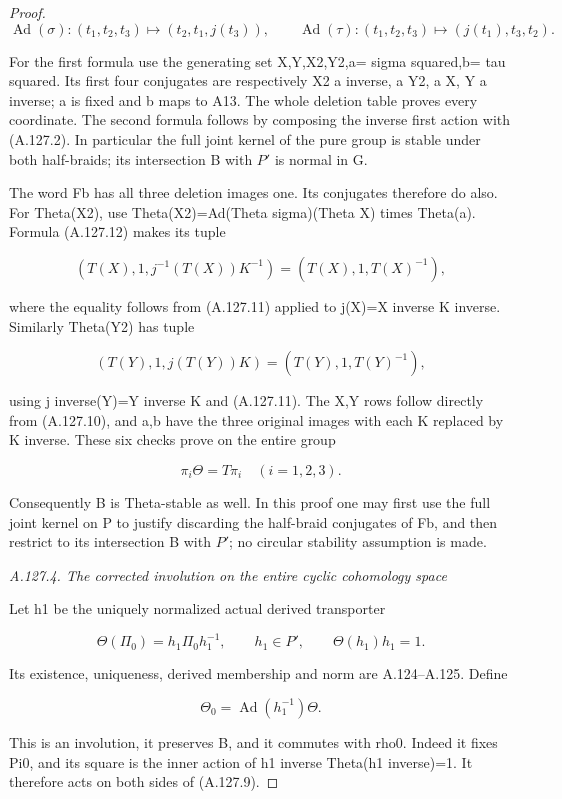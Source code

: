 \begin{proof}
\[
 \operatorname{Ad}(\sigma):(t_1,t_2,t_3)\mapsto(t_2,t_1,j(t_3)),
\qquad
 \operatorname{Ad}(\tau):(t_1,t_2,t_3)\mapsto(j(t_1),t_3,t_2).
\tag{A.127.12}
\]

For the first formula use the generating set X,Y,X2,Y2,a= sigma squared,b= tau squared. Its first four conjugates are respectively X2 a inverse, a Y2, a X, Y a inverse; a is fixed and b maps to A13. The whole deletion table proves every coordinate. The second formula follows by composing the inverse first action with (A.127.2). In particular the full joint kernel of the pure group is stable under both half-braids; its intersection B with \(P'\) is normal in G.

The word Fb has all three deletion images one. Its conjugates therefore do also. For Theta(X2), use Theta(X2)=Ad(Theta sigma)(Theta X) times Theta(a). Formula (A.127.12) makes its tuple

\[
 (T(X),1,j^{-1}(T(X))K^{-1})=(T(X),1,T(X)^{-1}),
\]

where the equality follows from (A.127.11) applied to j(X)=X inverse K inverse. Similarly Theta(Y2) has tuple

\[
 (T(Y),1,j(T(Y))K)=(T(Y),1,T(Y)^{-1}),
\]

using j inverse(Y)=Y inverse K and (A.127.11). The X,Y rows follow directly from (A.127.10), and a,b have the three original images with each K replaced by K inverse. These six checks prove on the entire group

\[
 \pi_i\Theta=T\pi_i\quad(i=1,2,3).
\tag{A.127.13}
\]

Consequently B is Theta-stable as well. In this proof one may first use the full joint kernel on P to justify discarding the half-braid conjugates of Fb, and then restrict to its intersection B with \(P'\); no circular stability assumption is made.

\par\smallskip\noindent\emph{A.127.4. The corrected involution on the entire cyclic cohomology space}

Let h1 be the uniquely normalized actual derived transporter

\[
 \Theta(\Pi_0)=h_1\Pi_0h_1^{-1},\qquad
 h_1\in P',\qquad\Theta(h_1)h_1=1.
\tag{A.127.14}
\]

Its existence, uniqueness, derived membership and norm are A.124--A.125. Define

\[
 \Theta_0=\operatorname{Ad}(h_1^{-1})\Theta.
\tag{A.127.15}
\]

This is an involution, it preserves B, and it commutes with rho0. Indeed it fixes Pi0, and its square is the inner action of h1 inverse Theta(h1 inverse)=1. It therefore acts on both sides of (A.127.9).


\end{proof}
